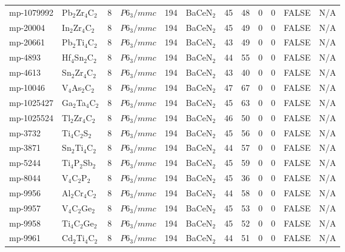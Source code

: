 {\begin{longtable}{llcccccccccc}
    mp-1079992 & Pb$_{2}$Zr$_{4}$C$_{2}$ & 8     & $P6_3/mmc$ & 194   & BaCeN$_{2}$ & 45    & 48    & 0     & 0     & FALSE & N/A \\
    mp-20004 & In$_{2}$Zr$_{4}$C$_{2}$ & 8     & $P6_3/mmc$ & 194   & BaCeN$_{2}$ & 45    & 49    & 0     & 0     & FALSE & N/A \\
    mp-20661 & Pb$_{2}$Ti$_{4}$C$_{2}$ & 8     & $P6_3/mmc$ & 194   & BaCeN$_{2}$ & 43    & 49    & 0     & 0     & FALSE & N/A \\
    mp-4893 & Hf$_{4}$Sn$_{2}$C$_{2}$ & 8     & $P6_3/mmc$ & 194   & BaCeN$_{2}$ & 44    & 55    & 0     & 0     & FALSE & N/A \\
    mp-4613 & Sn$_{2}$Zr$_{4}$C$_{2}$ & 8     & $P6_3/mmc$ & 194   & BaCeN$_{2}$ & 43    & 40    & 0     & 0     & FALSE & N/A \\
    mp-10046 & V$_{4}$As$_{2}$C$_{2}$ & 8     & $P6_3/mmc$ & 194   & BaCeN$_{2}$ & 47    & 67    & 0     & 0     & FALSE & N/A \\
    mp-1025427 & Ga$_{2}$Ta$_{4}$C$_{2}$ & 8     & $P6_3/mmc$ & 194   & BaCeN$_{2}$ & 45    & 63    & 0     & 0     & FALSE & N/A \\
    mp-1025524 & Tl$_{2}$Zr$_{4}$C$_{2}$ & 8     & $P6_3/mmc$ & 194   & BaCeN$_{2}$ & 46    & 50    & 0     & 0     & FALSE & N/A \\
    mp-3732 & Ti$_{4}$C$_{2}$S$_{2}$ & 8     & $P6_3/mmc$ & 194   & BaCeN$_{2}$ & 45    & 56    & 0     & 0     & FALSE & N/A \\
    mp-3871 & Sn$_{2}$Ti$_{4}$C$_{2}$ & 8     & $P6_3/mmc$ & 194   & BaCeN$_{2}$ & 44    & 57    & 0     & 0     & FALSE & N/A \\
    mp-5244 & Ti$_{4}$P$_{2}$Sb$_{2}$ & 8     & $P6_3/mmc$ & 194   & BaCeN$_{2}$ & 45    & 59    & 0     & 0     & FALSE & N/A \\
    mp-8044 & V$_{4}$C$_{2}$P$_{2}$ & 8     & $P6_3/mmc$ & 194   & BaCeN$_{2}$ & 45    & 36    & 0     & 0     & FALSE & N/A \\
    mp-9956 & Al$_{2}$Cr$_{4}$C$_{2}$ & 8     & $P6_3/mmc$ & 194   & BaCeN$_{2}$ & 44    & 58    & 0     & 0     & FALSE & N/A \\
    mp-9957 & V$_{4}$C$_{2}$Ge$_{2}$ & 8     & $P6_3/mmc$ & 194   & BaCeN$_{2}$ & 45    & 53    & 0     & 0     & FALSE & N/A \\
    mp-9958 & Ti$_{4}$C$_{2}$Ge$_{2}$ & 8     & $P6_3/mmc$ & 194   & BaCeN$_{2}$ & 45    & 52    & 0     & 0     & FALSE & N/A \\
    mp-9961 & Cd$_{2}$Ti$_{4}$C$_{2}$ & 8     & $P6_3/mmc$ & 194   & BaCeN$_{2}$ & 44    & 51    & 0     & 0     & FALSE & N/A \\

\end{longtable}}
